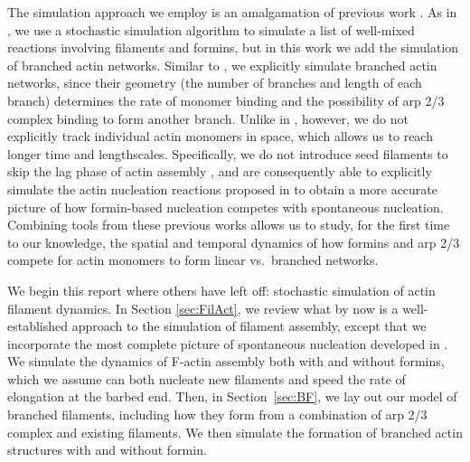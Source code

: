 \documentclass[11pt]{article}
\begin{document}
The simulation approach we employ is an amalgamation of previous work \cite{fass2008stochastic, ni2019turnover, banerjee2022emergence}. As in \cite{fass2008stochastic, banerjee2022emergence}, we use a stochastic simulation algorithm to simulate a list of well-mixed reactions involving filaments and formins, but in this work we add the simulation of branched actin networks. Similar to \cite{ni2019turnover, liman2020role}, we explicitly simulate branched actin networks, since their geometry (the number of branches and length of each branch) determines the rate of monomer binding and the possibility of arp 2/3 complex binding to form another branch. Unlike in \cite{ni2019turnover}, however, we do not explicitly track individual actin monomers in space, which allows us to reach longer time and lengthscales. Specifically, we do not introduce seed filaments to skip the lag phase of actin assembly \cite{chandrasekaran2022nucleation}, and are consequently able to explicitly simulate the actin nucleation reactions proposed in \cite{rosenbloom2021mechanism} to obtain a more accurate picture of how formin-based nucleation competes with spontaneous nucleation. Combining tools from these previous works allows us to study, for the first time to our knowledge, the spatial and temporal dynamics of how formins and arp 2/3 compete for actin monomers to form linear vs.\ branched networks.

We begin this report where others have left off: stochastic simulation of actin filament dynamics. In Section \ref{sec:FilAct}, we review what by now is a well-established approach to the simulation of filament assembly, except that we incorporate the most complete picture of spontaneous nucleation developed in \cite{rosenbloom2021mechanism}. We simulate the dynamics of F-actin assembly both with and without formins, which we assume can both nucleate new filaments and speed the rate of elongation at the barbed end. Then, in Section\ \ref{sec:BF}, we lay out our model of branched filaments, including how they form from a combination of arp 2/3 complex and existing filaments. We then simulate the formation of branched actin structures with and without formin.
\end{document}
